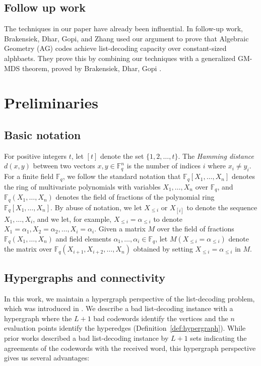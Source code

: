 \documentclass{article}[11pt]
\begin{document}
\subsection*{Follow up work}

The techniques in our paper have already been influential. In follow-up work, Brakensiek, Dhar, Gopi, and Zhang \cite{BDGZ23} used our argument to prove that Algebraic Geometry (AG) codes achieve list-decoding capacity over constant-sized alphbaets. They prove this by combining our techniques with a generalized GM-MDS theorem, proved by Brakensiek, Dhar, Gopi \cite{BDG23}. 

\section{Preliminaries}
\label{sec:prelim}


\subsection{Basic notation}
For positive integers $t$, let $[t]$ denote the set $\{1,2,\dots,t\}$.
The \emph{Hamming distance} $d(x,y)$ between two vectors $x,y\in\mathbb{F}_q^n$ is the number of indices $i$ where $x_i\neq y_i$.
For a finite field $\mathbb{F}_q$, we follow the standard notation that $\mathbb{F}_q[X_1,\dots,X_n]$ denotes the ring of multivariate polynomials with variables $X_1,\dots,X_n$ over $\mathbb{F}_q$, and $\mathbb{F}_q(X_1,\dots,X_n)$ denotes the field of fractions of the polynomial ring $\mathbb{F}_q[X_1,\dots,X_n]$.
By abuse of notation, we let $X_{\le i}$ or $X_{[i]}$ to denote the sequence $X_1,\dots,X_i$, and we let, for example, $X_{\le i}=\alpha_{\le i}$ to denote $X_1=\alpha_1,X_2=\alpha_2,\dots,X_i=\alpha_i$.
Given a matrix $M$ over the field of fractions $\mathbb{F}_q(X_1,\dots,X_n)$ and field elements $\alpha_1,\dots,\alpha_i\in\mathbb{F}_q$,  let $M(X_{\le i}=\alpha_{\le i})$ denote the matrix over $\mathbb{F}_q(X_{i+1},X_{i+2},\dots,X_n)$ obtained by setting $X_{\le i}=\alpha_{\le i}$ in $M$.






\subsection{Hypergraphs and connectivity}
\label{ssec:hypergraph}
In this work, we maintain a hypergraph perspective of the list-decoding problem, which was introduced in \cite{GLSTW21}. We describe a bad list-decoding instance with a hypergraph where the $L+1$ bad codewords identify the vertices and the $n$ evaluation points identify the hyperedges (Definition~\ref{def:hypergraph}).
While prior works described a bad list-decoding instance by $L+1$ sets indicating the agreements of the codewords with the received word, this hypergraph perspective gives us several advantages:
\end{document}
